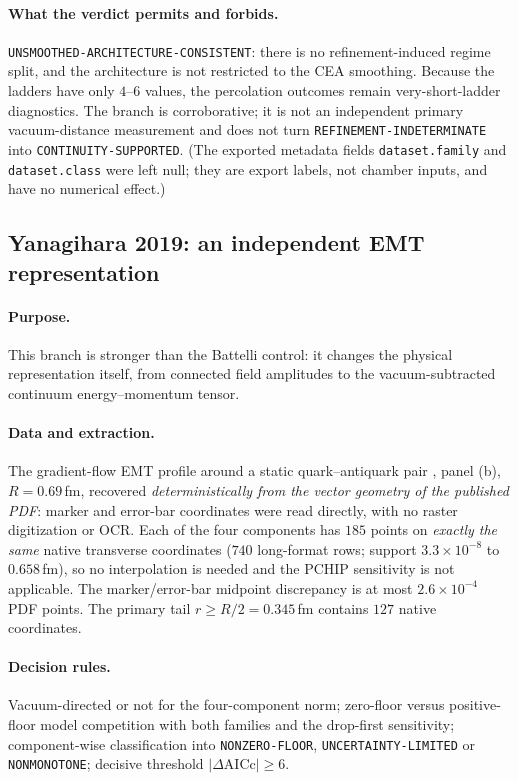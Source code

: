 \documentclass[11pt,a4paper]{article}
\theoremstyle{definition}
\theoremstyle{remark}
\begin{document}
\paragraph{What the verdict permits and forbids.} \texttt{UNSMOOTHED-\allowbreak{}ARCHITECTURE-\allowbreak{}CONSISTENT}: there is no refinement-induced regime split, and the architecture is not restricted to the CEA smoothing. Because the ladders have only $4$--$6$ values, the percolation outcomes remain very-short-ladder diagnostics. The branch is corroborative; it is not an independent primary vacuum-distance measurement and does not turn \texttt{REFINEMENT-\allowbreak{}INDETERMINATE} into \texttt{CONTINUITY-\allowbreak{}SUPPORTED}. (The exported metadata fields \texttt{dataset.family} and \texttt{dataset.class} were left null; they are export labels, not chamber inputs, and have no numerical effect.)

\subsection{Yanagihara 2019: an independent EMT representation}\label{ssec:emt}
\paragraph{Purpose.} This branch is stronger than the Battelli control: it changes the physical representation itself, from connected field amplitudes to the vacuum-subtracted continuum energy--momentum tensor.
\paragraph{Data and extraction.} The gradient-flow EMT profile around a static quark--antiquark pair \cite{Yanagihara19}, panel (b), $R=0.69$\,fm, recovered \emph{deterministically from the vector geometry of the published PDF}: marker and error-bar coordinates were read directly, with no raster digitization or OCR. Each of the four components has $185$ points on \emph{exactly the same} native transverse coordinates ($740$ long-format rows; support $3.3\times10^{-8}$ to $0.658$\,fm), so no interpolation is needed and the PCHIP sensitivity is not applicable. The marker/error-bar midpoint discrepancy is at most $2.6\times10^{-4}$ PDF points. The primary tail $r\ge R/2=0.345$\,fm contains $127$ native coordinates.
\paragraph{Decision rules.} Vacuum-directed or not for the four-component norm; zero-floor versus positive-floor model competition with both families and the drop-first sensitivity; component-wise classification into \texttt{NONZERO-\allowbreak{}FLOOR}, \texttt{UNCERTAINTY-\allowbreak{}LIMITED} or \texttt{NONMONOTONE}; decisive threshold $|\Delta\mathrm{AICc}|\ge6$.
\end{document}
